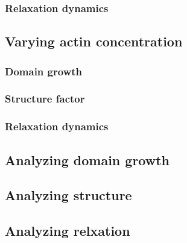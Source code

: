 \documentclass[a4paper,11pt]{custom}
\begin{document}
\subsubsection{Relaxation dynamics}
\label{sec:orge4847ff}

\subsection{Varying actin concentration}
\label{sec:org11a16c7}

\subsubsection{Domain growth}
\label{sec:org8352486}

\subsubsection{Structure factor}
\label{sec:orgafb27db}

\subsubsection{Relaxation dynamics}
\label{sec:org2d9c04d}

\subsection{Analyzing domain growth}
\label{sec:org7d58f9d}

\subsection{Analyzing structure}
\label{sec:orge304e72}

\subsection{Analyzing relxation}
\label{sec:orgc396360}
\end{document}
